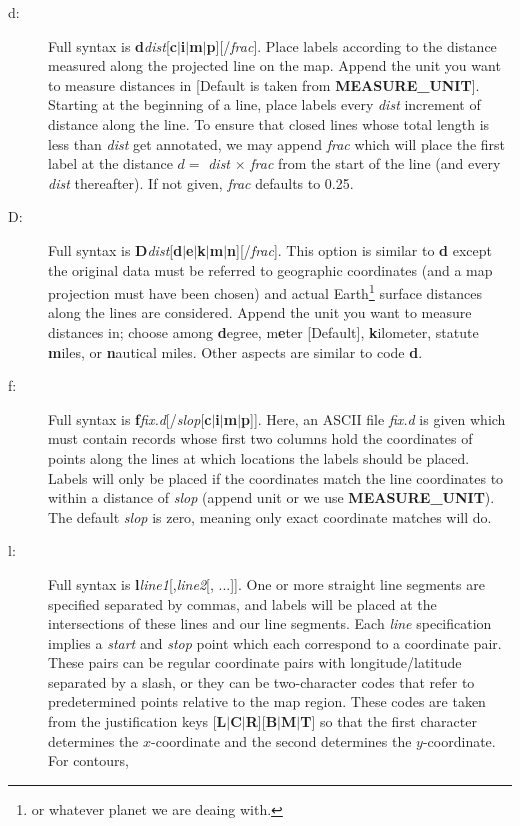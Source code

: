 \begin{description}
\item [d:] Full syntax is {\bf d}{\it dist}[{\bf c$|$i$|$m$|$p}][/{\it frac}].
Place labels according to the distance measured along the projected line on the map.  Append the
unit you want to measure distances in [Default is taken from {\bf MEASURE\_UNIT}].
Starting at the beginning of a line, place labels every {\it dist} increment of
distance along the line.  To ensure that closed lines whose total length is less
than {\it dist} get annotated, we may append {\it frac} which will place the first
label at the distance $d =$ {\it dist} $\times$ {\it frac} from the start of the
line (and every {\it dist} thereafter).  If not given, {\it frac} defaults to 0.25.
\item [D:] Full syntax is {\bf D}{\it dist}[{\bf d$|$e$|$k$|$m$|$n}][/{\it frac}].
This option is similar to {\bf d} except the original data must be referred to geographic
coordinates (and a map projection must have been chosen) and actual Earth\footnote{or whatever
planet we are deaing with.} surface distances along the lines are considered.  Append the
unit you want to measure distances in; choose among {\bf d}egree, m{\bf e}ter [Default],
{\bf k}ilometer, statute {\bf m}iles, or {\bf n}autical miles.  Other aspects are similar to code {\bf d}.
\item [f:] Full syntax is {\bf f}{\it fix.d}[/{\it slop}[{\bf c$|$i$|$m$|$p}]].  Here, an ASCII file {\it fix.d} is
given which must contain records whose first two columns hold the coordinates of points along
the lines at which locations the labels should be placed.  Labels will only be placed if the coordinates
match the line coordinates to within a distance of {\it slop} (append unit or we use {\bf MEASURE\_UNIT}).
The default {\it slop} is zero, meaning only exact coordinate matches will do.
\item [l:] Full syntax is {\bf l}{\it line1}[,{\it line2}[, ...]].  One or more straight line segments
are specified separated by commas, and labels will be placed at the intersections of these lines and
our line segments.  Each {\it line} specification implies a {\it start} and {\it stop} point which each
correspond to a coordinate pair.  These pairs can be regular coordinate pairs with longitude/latitude separated by a slash, or they
can be two-character codes that refer to predetermined points relative to the map region.  These codes
are taken from the  justification keys [{\bf L$|$C$|$R}][{\bf B$|$M$|$T}] so that the first
character determines the $x$-coordinate and the second determines the $y$-coordinate.  For contours,

\end{description}
